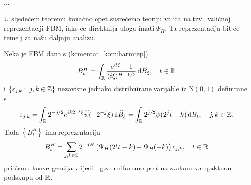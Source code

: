 \documentclass[main.tex]{subfiles}
\begin{document}
\begin{komentar}
	...
\end{komentar}

U sljedećem teoremu konačno opet susrećemo teoriju valića na tzv.\ valićnoj
reprezentaciji FBM, iako će direktniju ulogu imati \( \Psi_H \).
Ta reprezentacija bit će temelj za našu daljnju analizu.

\begin{teorem}\label{holpo-teorem1}
	Neka je FBM dano s (komentar~\ref{kom:harmrep})
	\begin{equation}
		B^H_t = \int_{\mathbb{R}} \frac{e^{it\xi}-1}{(i\xi)^{H+1/2}} \,\mathrm d \widehat{B}_\xi, \quad t \in \mathbb{R}
	\end{equation}
	i
	\( \left\{ \varepsilon_{j,k} \, \colon \, j,k \in \mathbb{Z} \right\} \)
	nezavisne jednako distribuirane varijable iz \( \mathrm N(0,1) \) definirane s
	\begin{equation}\label{eq:defepsjk}
		\varepsilon_{j,k} =
		\int_{\mathbb{R}} 2^{-j/2}e^{ik2^{-j}\xi}\widehat{\psi}(-2^{-j}\xi)\,\mathrm d \widehat{B}_\xi =
		\int_{\mathbb{R}} 2^{j/2} \psi(2^jt-k) \,\mathrm d B_t, \quad j,k\in \mathbb{Z}.
	\end{equation}
	Tada \( \left\{ B^H_t  \right\} \) ima reprezentaciju
	\begin{equation}\label{eq:valfbmrep}
		B^H_t = \sum_{j,k \in \mathbb{Z}}
		2^{-jH} \left( \Psi_H(2^jt - k) - \Psi_H(-k)  \right) \varepsilon_{j,k}, \quad t \in \mathbb{R}
	\end{equation}
	pri čemu konvergencija vrijedi i g.s.\ uniformno po \( t \) na svakom
	kompaktnom podskupu od \( \mathbb{R} \).
\end{teorem}
\end{document}
